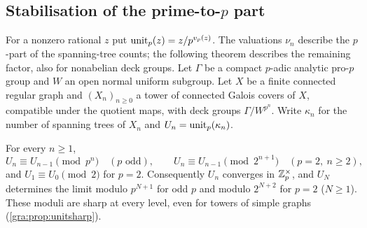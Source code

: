 \subsection{Stabilisation of the prime-to-$p$ part}\label{gra:sec:units}

For a nonzero rational $z$ put $\operatorname{unit}_p(z)=z/p^{v_p(z)}$. The valuations
$\nu_n$ describe the $p$-part of the spanning-tree counts; the following
theorem describes the remaining factor, also for nonabelian deck groups.
Let $\Gamma$ be a compact $p$-adic analytic pro-$p$ group and $W$ an open
normal uniform subgroup. Let $X$ be a finite connected regular graph and
$(X_n)_{n\ge0}$ a tower of connected Galois covers of $X$, compatible
under the quotient maps, with deck groups $\Gamma/W^{p^n}$. Write
$\kappa_n$ for the number of spanning trees of $X_n$ and
$U_n=\operatorname{unit}_p(\kappa_n)$.

\begin{theorem}\label{gra:thm:units}
For every $n\ge1$,
\[
 U_n\equiv U_{n-1}\pmod{p^n}\quad(p\text{ odd}),\qquad
 U_n\equiv U_{n-1}\pmod{2^{n+1}}\quad(p=2,\ n\ge2),
\]
and $U_1\equiv U_0\pmod2$ for $p=2$. Consequently $U_n$ converges in
$\mathbb{Z}_p^\times$, and $U_N$ determines the limit modulo $p^{N+1}$ for odd $p$
and modulo $2^{N+2}$ for $p=2$ ($N\ge1$). These moduli are sharp at every
level, even for towers of simple graphs (\cref{gra:prop:unitsharp}).
\end{theorem}

